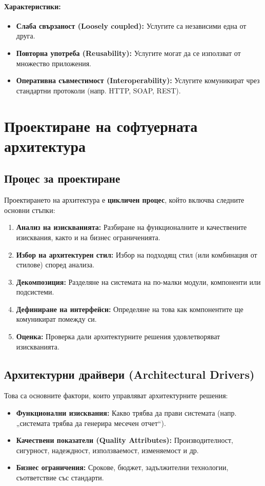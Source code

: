 \documentclass{scrartcl}
\begin{document}
\begin{FlushLeft}
\paragraph{Характеристики:}
\begin{itemize}
    \item \textbf{Слаба свързаност (Loosely coupled):} Услугите са независими една от друга.
    \item \textbf{Повторна употреба (Reusability):} Услугите могат да се използват от множество приложения.
    \item \textbf{Оперативна съвместимост (Interoperability):} Услугите комуникират чрез стандартни протоколи (напр. HTTP, SOAP, REST).
\end{itemize}

\newpage
\section{Проектиране на софтуерната архитектура}

\subsection{Процес за проектиране}

Проектирането на архитектура е \textbf{цикличен процес}, който включва следните основни стъпки:
\begin{enumerate}
    \item \textbf{Анализ на изискванията:} Разбиране на функционалните и качествените изисквания, както и на бизнес ограниченията.
    \item \textbf{Избор на архитектурен стил:} Избор на подходящ стил (или комбинация от стилове) според анализа.
    \item \textbf{Декомпозиция:} Разделяне на системата на по-малки модули, компоненти или подсистеми.
    \item \textbf{Дефиниране на интерфейси:} Определяне на това как компонентите ще комуникират помежду си.
    \item \textbf{Оценка:} Проверка дали архитектурните решения удовлетворяват изискванията.
\end{enumerate}

\subsection{Архитектурни драйвери (Architectural Drivers)}

Това са основните фактори, които управляват архитектурните решения:
\begin{itemize}
    \item \textbf{Функционални изисквания:} Какво трябва да прави системата (напр. „системата трябва да генерира месечен отчет“).
    \item \textbf{Качествени показатели (Quality Attributes):} Производителност, сигурност, надеждност, използваемост, изменяемост и др.
    \item \textbf{Бизнес ограничения:} Срокове, бюджет, задължителни технологии, съответствие със стандарти.
\end{itemize}


\end{FlushLeft}
\end{document}

